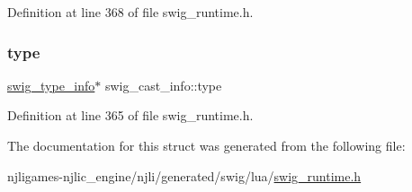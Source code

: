 Definition at line 368 of file swig\+\_\+runtime.\+h.

\mbox{\label{structswig__cast__info_a1c9023a301c8d6806209f4e10df6e9e0}} 
\subsubsection{\texorpdfstring{type}{type}}
{\footnotesize\ttfamily \mbox{\hyperlink{structswig__type__info}{swig\+\_\+type\+\_\+info}}$\ast$ swig\+\_\+cast\+\_\+info\+::type}



Definition at line 365 of file swig\+\_\+runtime.\+h.



The documentation for this struct was generated from the following file\+:\begin{DoxyCompactItemize}
\item 
njligames-\/njlic\+\_\+engine/njli/generated/swig/lua/\mbox{\hyperlink{swig__runtime_8h}{swig\+\_\+runtime.\+h}}\end{DoxyCompactItemize}
